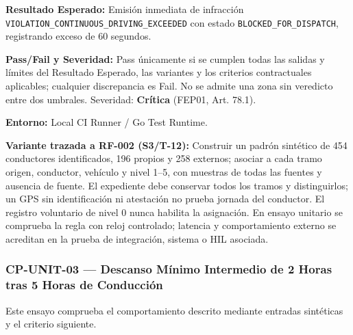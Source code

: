 \par\noindent\textbf{Resultado Esperado:} Emisión inmediata de infracción \texttt{V\allowbreak{}I\allowbreak{}O\allowbreak{}L\allowbreak{}A\allowbreak{}T\allowbreak{}I\allowbreak{}O\allowbreak{}N\allowbreak{}\_\allowbreak{}C\allowbreak{}O\allowbreak{}N\allowbreak{}T\allowbreak{}I\allowbreak{}N\allowbreak{}U\allowbreak{}O\allowbreak{}U\allowbreak{}S\allowbreak{}\_\allowbreak{}D\allowbreak{}R\allowbreak{}I\allowbreak{}V\allowbreak{}I\allowbreak{}N\allowbreak{}G\allowbreak{}\_\allowbreak{}E\allowbreak{}X\allowbreak{}C\allowbreak{}E\allowbreak{}E\allowbreak{}D\allowbreak{}E\allowbreak{}D\allowbreak{}} con estado \texttt{B\allowbreak{}L\allowbreak{}O\allowbreak{}C\allowbreak{}K\allowbreak{}E\allowbreak{}D\allowbreak{}\_\allowbreak{}F\allowbreak{}O\allowbreak{}R\allowbreak{}\_\allowbreak{}D\allowbreak{}I\allowbreak{}S\allowbreak{}P\allowbreak{}A\allowbreak{}T\allowbreak{}C\allowbreak{}H\allowbreak{}}, registrando exceso de 60 segundos.\par
\par\noindent\textbf{Pass/Fail y Severidad:} Pass únicamente si se cumplen todas las salidas y límites del Resultado Esperado, las variantes y los criterios contractuales aplicables; cualquier discrepancia es Fail. No se admite una zona sin veredicto entre dos umbrales. Severidad: \textbf{Crítica} (FEP01, Art. 78.1).\par
\par\noindent\textbf{Entorno:} Local CI Runner / Go Test Runtime.\par







\par\noindent\textbf{Variante trazada a RF-002 (S3/T-12):} Construir un padrón sintético de 454 conductores identificados, 196 propios y 258 externos; asociar a cada tramo origen, conductor, vehículo y nivel 1–5, con muestras de todas las fuentes y ausencia de fuente. El expediente debe conservar todos los tramos y distinguirlos; un GPS sin identificación ni atestación no prueba jornada del conductor. El registro voluntario de nivel 0 nunca habilita la asignación. En ensayo unitario se comprueba la regla con reloj controlado; latencia y comportamiento externo se acreditan en la prueba de integración, sistema o HIL asociada.\par
\subsubsection*{CP-UNIT-03 — Descanso Mínimo Intermedio de 2 Horas tras 5 Horas de Conducción}\label{sec:9-cp-unit-03}
Este ensayo comprueba el comportamiento descrito mediante entradas sintéticas y el criterio siguiente.

